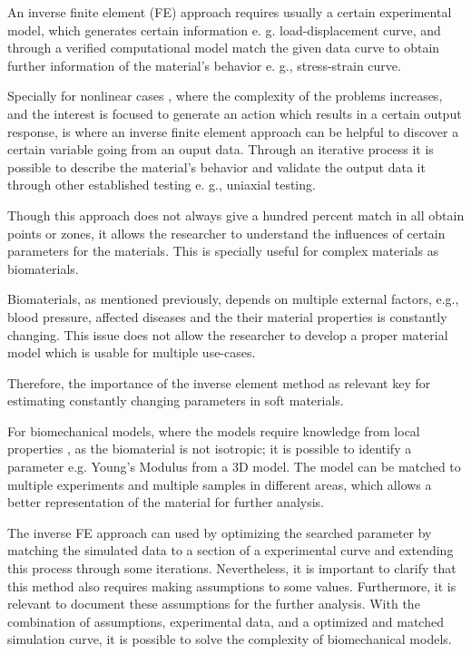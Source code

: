 An inverse finite element (FE) approach requires usually a certain experimental model,
 which generates certain information e. g. load-displacement curve, and through 
a verified computational model match the given data curve to obtain further information 
of the material's behavior e. g., stress-strain curve.

Specially for nonlinear cases \cite{Husain2004}, where the complexity of the problems 
increases, and the interest is focused to generate an action which results in a 
certain output response, is where an inverse finite element approach can be helpful 
to discover a certain variable going from an ouput data. Through an iterative process it is 
possible to describe the material's behavior and validate the output data it 
through other established testing e. g., uniaxial testing.

Though this approach does not always give a hundred percent match in all obtain points 
or zones, it allows the researcher to understand the influences of certain parameters 
for the materials. This is specially useful for complex materials as biomaterials. 

Biomaterials, as mentioned previously, depends on multiple external factors, e.g., blood 
pressure, affected diseases and the their material properties is constantly changing. 
This issue does not allow the researcher to develop a proper material model which is 
usable for multiple use-cases. 

Therefore, the importance of the inverse element method as relevant key for estimating 
constantly changing parameters in soft materials.

For biomechanical models, where the models require knowledge from local properties \cite{Chai2013},
as the biomaterial is not isotropic; it is possible to identify a parameter e.g. Young's Modulus 
from a 3D model. The model can be matched to multiple experiments and multiple samples in different areas,
which allows a better representation of the material for further analysis.

The inverse FE approach can used by optimizing the searched parameter by matching the simulated data
to a section of a experimental curve and extending this process through some iterations. 
Nevertheless, it is important to clarify that this method also requires making assumptions to some values.
Furthermore, it is relevant to document these assumptions for the further analysis. 
With the combination of assumptions, experimental data, and a optimized and matched simulation curve, it
is possible to solve the complexity of biomechanical models.
 
